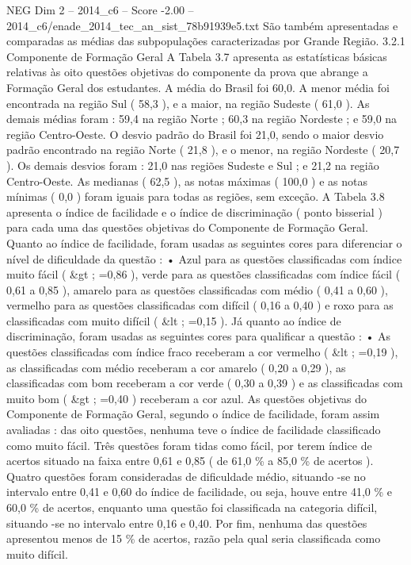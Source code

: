 \begin{textsample}{NEG Dim 2 – 2014\_c6 – Score -2.00 – 2014\_c6/enade\_2014\_tec\_an\_sist\_78b91939e5.txt}
São também apresentadas e comparadas as médias das subpopulações caracterizadas por Grande Região. 3.2.1 Componente de Formação Geral A Tabela 3.7 apresenta as estatísticas básicas relativas às oito questões objetivas do componente da prova que abrange a Formação Geral dos estudantes.
A média do Brasil foi 60,0.
A menor média foi encontrada na região Sul ( 58,3 ), e a maior, na região Sudeste ( 61,0 ).
As demais médias foram : 59,4 na região Norte ; 60,3 na região Nordeste ; e 59,0 na região Centro-Oeste.
O desvio padrão do Brasil foi 21,0, sendo o maior desvio padrão encontrado na região Norte ( 21,8 ), e o menor, na região Nordeste ( 20,7 ).
Os demais desvios foram : 21,0 nas regiões Sudeste e Sul ; e 21,2 na região Centro-Oeste.
As medianas ( 62,5 ), as notas máximas ( 100,0 ) e as notas mínimas ( 0,0 ) foram iguais para todas as regiões, sem exceção.
A Tabela 3.8 apresenta o índice de facilidade e o índice de discriminação ( ponto bisserial ) para cada uma das questões objetivas do Componente de Formação Geral.
Quanto ao índice de facilidade, foram usadas as seguintes cores para diferenciar o nível de dificuldade da questão : • Azul para as questões classificadas com índice muito fácil ( \&gt ; =0,86 ), verde para as questões classificadas com índice fácil ( 0,61 a 0,85 ), amarelo para as questões classificadas com médio ( 0,41 a 0,60 ), vermelho para as questões classificadas com difícil ( 0,16 a 0,40 ) e roxo para as classificadas com muito difícil ( \&lt ; =0,15 ).
Já quanto ao índice de discriminação, foram usadas as seguintes cores para qualificar a questão : • As questões classificadas com índice fraco receberam a cor vermelho ( \&lt ; =0,19 ), as classificadas com médio receberam a cor amarelo ( 0,20 a 0,29 ), as classificadas com bom receberam a cor verde ( 0,30 a 0,39 ) e as classificadas com muito bom ( \&gt ; =0,40 ) receberam a cor azul.
As questões objetivas do Componente de Formação Geral, segundo o índice de facilidade, foram assim avaliadas : das oito questões, nenhuma teve o índice de facilidade classificado como muito fácil.
Três questões foram tidas como fácil, por terem índice de acertos situado na faixa entre 0,61 e 0,85 ( de 61,0 \% a 85,0 \% de acertos ).
Quatro questões foram consideradas de dificuldade médio, situando -se no intervalo entre 0,41 e 0,60 do índice de facilidade, ou seja, houve entre 41,0 \% e 60,0 \% de acertos, enquanto uma questão foi classificada na categoria difícil, situando -se no intervalo entre 0,16 e 0,40.
Por fim, nenhuma das questões apresentou menos de 15 \% de acertos, razão pela qual seria classificada como muito difícil.

\end{textsample}
